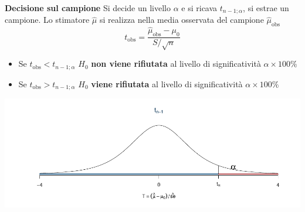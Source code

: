 \documentclass[
  11pt,
]{book}
\providecommand{\tightlist}{%
  \setlength{\itemsep}{0pt}\setlength{\parskip}{0pt}}
\theoremstyle{mytheoremstyle}
\theoremstyle{mydefstyle}
\begin{document}
\begin{info}

\textbf{Decisione sul campione} Si decide un livello \(\alpha\) e si ricava
\(t_{n-1;\alpha}\), si estrae un campione. Lo stimatore \(\hat\mu\) si
realizza nella media osservata del campione \(\hat\mu_\text{obs}\)
\[t_{\text{obs}}=\frac{\hat\mu_\text{obs} -\mu_0}{S/\sqrt n}\]

\begin{itemize}
\tightlist
\item
  Se \(t_{\text{obs}}<t_{n-1;\alpha}\) \(H_0\) \textbf{non viene rifiutata} al
  livello di significatività \(\alpha\times100\%\)
\item
  Se \(t_{\text{obs}}>t_{n-1;\alpha}\) \(H_0\) \textbf{viene rifiutata} al
  livello di significatività \(\alpha\times100\%\)
\end{itemize}

\begin{center}\includegraphics{Appunti_di_Statistica_2025_files/figure-latex/15-test-mu-pi-22-1} \end{center}

\end{info}
\end{document}
